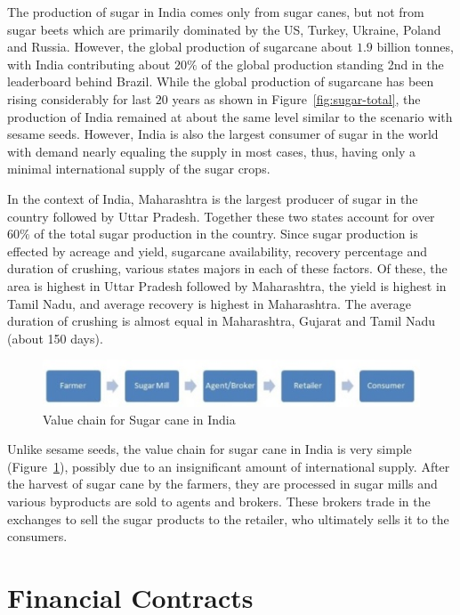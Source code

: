 \documentclass[12pt]{report}
\begin{document}
The production of sugar in India comes only from sugar canes, but not from sugar beets which are primarily dominated by the US, Turkey, Ukraine, Poland and Russia. However, the global production of sugarcane about $1.9$ billion tonnes, with India contributing about $20\%$ of the global production standing 2nd in the leaderboard behind Brazil. While the global production of sugarcane has been rising considerably for last $20$ years as shown in Figure~\ref{fig:sugar-total}, the production of India remained at about the same level similar to the scenario with sesame seeds. However, India is also the largest consumer of sugar in the world with demand nearly equaling the supply in most cases, thus, having only a minimal international supply of the sugar crops.

In the context of India, Maharashtra is the largest producer of sugar in the country followed by Uttar Pradesh. Together these two states account for over $60\%$ of the total sugar production in the country. Since sugar production is effected by acreage and yield, sugarcane availability, recovery percentage and duration of crushing, various states majors in each of these factors. Of these, the area is highest in Uttar Pradesh followed by Maharashtra, the yield is highest in Tamil Nadu, and average recovery is highest in Maharashtra. The average duration of crushing is almost equal in Maharashtra, Gujarat and Tamil Nadu (about 150 days). 


\begin{figure}[h]
    \centering
    \includegraphics[width = 0.8\linewidth]{sugar_value_chain.jpg}
    \caption{Value chain for Sugar cane in India}
    \label{fig:sugar-vc}
\end{figure}


Unlike sesame seeds, the value chain for sugar cane in India is very simple (Figure~\ref{fig:sugar-vc}), possibly due to an insignificant amount of international supply. After the harvest of sugar cane by the farmers, they are processed in sugar mills and various byproducts are sold to agents and brokers. These brokers trade in the exchanges to sell the sugar products to the retailer, who ultimately sells it to the consumers.


\section{Financial Contracts}
\end{document}
